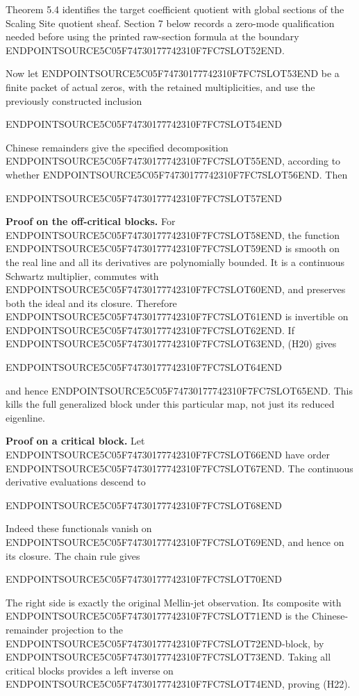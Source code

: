 Theorem 5.4 identifies the target coefficient quotient with global sections of the Scaling Site quotient sheaf. Section 7 below records a zero-mode qualification needed before using the printed raw-section formula at the boundary ENDPOINTSOURCE5C05F74730177742310F7FC7SLOT52END.

Now let ENDPOINTSOURCE5C05F74730177742310F7FC7SLOT53END be a finite packet of actual zeros, with the retained multiplicities, and use the previously constructed inclusion

ENDPOINTSOURCE5C05F74730177742310F7FC7SLOT54END

Chinese remainders give the specified decomposition ENDPOINTSOURCE5C05F74730177742310F7FC7SLOT55END, according to whether ENDPOINTSOURCE5C05F74730177742310F7FC7SLOT56END. Then

ENDPOINTSOURCE5C05F74730177742310F7FC7SLOT57END

\textbf{Proof on the off-critical blocks.} For ENDPOINTSOURCE5C05F74730177742310F7FC7SLOT58END, the function ENDPOINTSOURCE5C05F74730177742310F7FC7SLOT59END is smooth on the real line and all its derivatives are polynomially bounded. It is a continuous Schwartz multiplier, commutes with ENDPOINTSOURCE5C05F74730177742310F7FC7SLOT60END, and preserves both the ideal and its closure. Therefore ENDPOINTSOURCE5C05F74730177742310F7FC7SLOT61END is invertible on ENDPOINTSOURCE5C05F74730177742310F7FC7SLOT62END. If ENDPOINTSOURCE5C05F74730177742310F7FC7SLOT63END, (H20) gives

ENDPOINTSOURCE5C05F74730177742310F7FC7SLOT64END

and hence ENDPOINTSOURCE5C05F74730177742310F7FC7SLOT65END. This kills the full generalized block under this particular map, not just its reduced eigenline.

\textbf{Proof on a critical block.} Let ENDPOINTSOURCE5C05F74730177742310F7FC7SLOT66END have order ENDPOINTSOURCE5C05F74730177742310F7FC7SLOT67END. The continuous derivative evaluations descend to

ENDPOINTSOURCE5C05F74730177742310F7FC7SLOT68END

Indeed these functionals vanish on ENDPOINTSOURCE5C05F74730177742310F7FC7SLOT69END, and hence on its closure. The chain rule gives

ENDPOINTSOURCE5C05F74730177742310F7FC7SLOT70END

The right side is exactly the original Mellin-jet observation. Its composite with ENDPOINTSOURCE5C05F74730177742310F7FC7SLOT71END is the Chinese-remainder projection to the ENDPOINTSOURCE5C05F74730177742310F7FC7SLOT72END-block, by ENDPOINTSOURCE5C05F74730177742310F7FC7SLOT73END. Taking all critical blocks provides a left inverse on ENDPOINTSOURCE5C05F74730177742310F7FC7SLOT74END, proving (H22).

